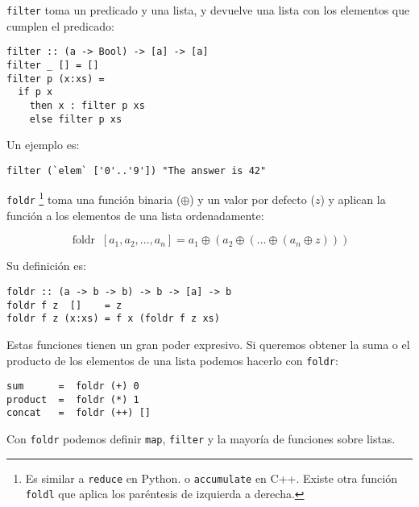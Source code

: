 \texttt{filter} toma un predicado y una lista, y devuelve una lista con los elementos
que cumplen el predicado:
\begin{lstlisting}
filter :: (a -> Bool) -> [a] -> [a]
filter _ [] = []
filter p (x:xs) =
  if p x
    then x : filter p xs
    else filter p xs
\end{lstlisting}

Un ejemplo es:

\begin{lstlisting}
filter (`elem` ['0'..'9']) "The answer is 42"
\end{lstlisting}

\texttt{foldr}
\footnote{Es similar a \texttt{reduce} en Python. o \texttt{accumulate} en C++.
Existe otra función \texttt{foldl} que aplica los paréntesis de izquierda a derecha.}
toma una función binaria ($\oplus$) y un valor por defecto ($z$) y
aplican la función a los elementos de una lista ordenadamente:

\begin{equation*}
\operatorname{foldr} \; [a_1 , a_2 , \dots , a_n] =
 a_1 \oplus  (a_2 \oplus  (\dots \oplus  (a_n \oplus  z )))
\end{equation*}

Su definición es:

\begin{lstlisting}
foldr :: (a -> b -> b) -> b -> [a] -> b
foldr f z  []    = z
foldr f z (x:xs) = f x (foldr f z xs)
\end{lstlisting}

Estas funciones tienen un gran poder expresivo. Si queremos obtener la suma
o el producto de los elementos de una lista podemos hacerlo con \texttt{foldr}:

\begin{lstlisting}
sum      =  foldr (+) 0
product  =  foldr (*) 1
concat   =  foldr (++) []
\end{lstlisting}

Con \texttt{foldr} podemos definir \texttt{map}, \texttt{filter} y la mayoría de
funciones sobre listas.
